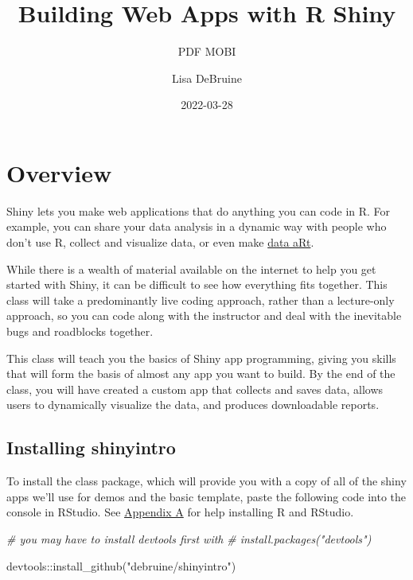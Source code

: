 \documentclass[
  oneside]{book}
\title{Building Web Apps with R Shiny}
\subtitle{PDF \textbar{} MOBI}
\author{Lisa DeBruine}
\date{2022-03-28}
\newenvironment{Shaded}{\begin{snugshade}}{\end{snugshade}}
\newcommand{\CommentTok}[1]{\textcolor[rgb]{0.56,0.35,0.01}{\textit{#1}}}
\newcommand{\FunctionTok}[1]{\textcolor[rgb]{0.00,0.00,0.00}{#1}}
\newcommand{\NormalTok}[1]{#1}
\newcommand{\SpecialCharTok}[1]{\textcolor[rgb]{0.00,0.00,0.00}{#1}}
\newcommand{\StringTok}[1]{\textcolor[rgb]{0.31,0.60,0.02}{#1}}
\begin{document}
\maketitle

{
\setcounter{tocdepth}{1}
\tableofcontents
}
\hypertarget{overview}{%
\chapter*{Overview}\label{overview}}

Shiny lets you make web applications that do anything you can code in R. For example, you can share your data analysis in a dynamic way with people who don't use R, collect and visualize data, or even make \href{https://towardsdatascience.com/getting-started-with-generative-art-in-r-3bc50067d34b}{data aRt}.

While there is a wealth of material available on the internet to help you get started with Shiny, it can be difficult to see how everything fits together. This class will take a predominantly live coding approach, rather than a lecture-only approach, so you can code along with the instructor and deal with the inevitable bugs and roadblocks together.

This class will teach you the basics of Shiny app programming, giving you skills that will form the basis of almost any app you want to build. By the end of the class, you will have created a custom app that collects and saves data, allows users to dynamically visualize the data, and produces downloadable reports.

\hypertarget{installing-shinyintro}{%
\section{Installing shinyintro}\label{installing-shinyintro}}

To install the class package, which will provide you with a copy of all of the shiny apps we'll use for demos and the basic template, paste the following code into the console in RStudio. See \protect\hyperlink{installing-r}{Appendix A} for help installing R and RStudio.

\begin{Shaded}
\begin{Highlighting}[]
\CommentTok{\# you may have to install devtools first with }
\CommentTok{\# install.packages("devtools")}

\NormalTok{devtools}\SpecialCharTok{::}\FunctionTok{install\_github}\NormalTok{(}\StringTok{"debruine/shinyintro"}\NormalTok{)}
\end{Highlighting}
\end{Shaded}
\end{document}
